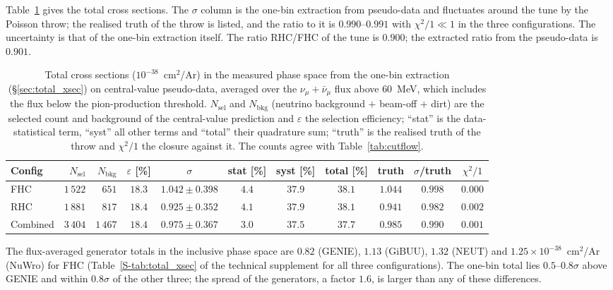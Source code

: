 \documentclass[11pt,a4paper]{article}
\newcommand{\suppref}[2]{#1~\ref{S-#2} of the technical supplement}
\begin{document}
Table~\ref{tab:cutcount} gives the total cross sections. The $\sigma$ column is the one-bin extraction from pseudo-data and fluctuates
around the tune by the Poisson throw; the realised truth of the throw is listed, and the ratio to it
is $0.990$--$0.991$ with $\chi^2/1\ll1$ in the three configurations. The uncertainty is that of the
one-bin extraction itself. The ratio RHC/FHC of the tune is $0.900$; the extracted ratio from the
pseudo-data is $0.901$.

\begin{table}[H]
  \centering
  \caption{Total cross sections ($10^{-38}$~cm$^2$/Ar) in the measured phase space from the one-bin
    extraction (\S\ref{sec:total_xsec}) on central-value pseudo-data, averaged over the
    $\nu_\mu+\bar\nu_\mu$ flux above $60$~MeV, which includes the flux below the pion-production
    threshold. $N_\mathrm{sel}$ and $N_\mathrm{bkg}$ (neutrino background $+$ beam-off $+$ dirt) are the
    selected count and background of the central-value prediction and $\varepsilon$ the selection
    efficiency; ``stat'' is the data-statistical term, ``syst'' all other terms and ``total'' their
    quadrature sum; ``truth'' is the realised truth of the throw and $\chi^2/1$ the closure against it.
    The counts agree with Table~\ref{tab:cutflow}.}
  \label{tab:cutcount}
  \footnotesize
  \begin{tabular}{lrrcccccccc}
\toprule
Config & $N_\mathrm{sel}$ & $N_\mathrm{bkg}$ & $\varepsilon$ [\%] & $\sigma$ & stat [\%] & syst [\%] & total [\%] & truth & $\sigma$/truth & $\chi^2/1$ \\
\midrule
    FHC      & $1\,522$ & $651$ & $18.3$ & $1.042\pm0.398$ & $4.4$ & $37.9$ & $38.1$ & $1.044$ & $0.998$ & $0.000$ \\
    RHC      & $1\,881$ & $817$ & $18.4$ & $0.925\pm0.352$ & $4.1$ & $37.9$ & $38.1$ & $0.941$ & $0.982$ & $0.002$ \\
    Combined & $3\,404$ & $1\,467$ & $18.4$ & $0.975\pm0.367$ & $3.0$ & $37.5$ & $37.7$ & $0.985$ & $0.990$ & $0.001$ \\
\bottomrule
\end{tabular}
\end{table}

The flux-averaged generator totals in the inclusive phase space are $0.82$ (GENIE), $1.13$ (GiBUU),
$1.32$ (NEUT) and $1.25\times10^{-38}$~cm$^2$/Ar (NuWro) for FHC (\suppref{Table}{tab:total_xsec}
for all three configurations). The one-bin total lies $0.5$--$0.8\sigma$ above GENIE and within
$0.8\sigma$ of the other three; the spread of the generators, a factor $1.6$, is larger than any of
these differences.
\end{document}
